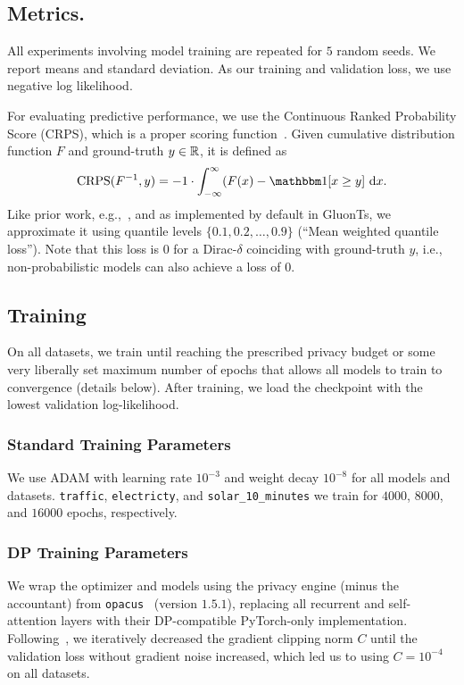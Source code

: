 \subsection{Metrics.}\label{appendix:metrics}
All experiments involving model training are repeated for $5$ random seeds. We report means and standard deviation.
As our training and validation loss, we use negative log likelihood.

For evaluating predictive performance, we use the Continuous Ranked Probability Score (CRPS),
which is a proper scoring function~\cite{gneiting2007strictly}. 
Given cumulative distribution function $F$ and ground-truth $y \in {\mathbb{R}}$, it is defined as
\begin{equation*}
    \mathrm{CRPS}(F^{-1}, y) = -1 \cdot \int_{-\infty}^{\infty} (F(x) - \indicator [x \geq y] \ \dd x .
\end{equation*}
Like prior work, e.g.,~\cite{rasul2021multivariate,chen2024recurrent,kollovieh2024predict}, and as implemented by default in GluonTs, 
we approximate it using quantile levels $\{0.1, 0.2,\dots, 0.9\}$ (``Mean weighted quantile loss''). 
Note that this loss is $0$ for a Dirac-$\delta$ coinciding with ground-truth $y$, i.e., non-probabilistic models can also achieve a loss of $0$.

\subsection{Training}
On all datasets, we train until reaching the prescribed privacy budget or some very liberally set maximum number of epochs that allows all models to train to convergence (details below).
After training, we load the checkpoint with the lowest validation log-likelihood.

\subsubsection{Standard Training Parameters}
We use ADAM with learning rate $10^{-3}$ and weight decay $10^{-8}$ for all models and datasets.
\texttt{traffic}, \texttt{electricty}, and \texttt{solar\_10\_minutes}
we train for $4000$, $8000$, and $16000$ epochs, respectively.

\subsubsection{DP Training Parameters}\label{appendix:setup_dp_training_parameters}
We wrap the optimizer and models using the privacy engine (minus the accountant) from \texttt{opacus}~\cite{opacus} (version $1.5.1$),
replacing all recurrent and self-attention layers with their DP-compatible PyTorch-only implementation.
Following~\cite{ponomareva2023dp}, we iteratively decreased the gradient clipping norm $C$ until the validation loss without gradient noise increased, which led us to using $C = 10^{-4}$ on all datasets.

